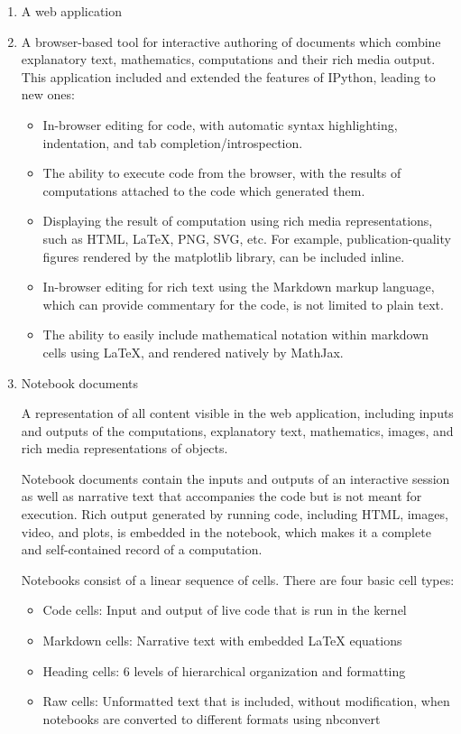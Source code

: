 \begin{enumerate}
\item A web application
\item A browser-based tool for interactive authoring of documents which combine
  explanatory text, mathematics, computations and their rich media output. This
  application included and extended the features of IPython, leading to new ones:
  \begin{itemize}
  \item In-browser editing for code, with automatic syntax highlighting, indentation, and
    tab completion/introspection.
  \item The ability to execute code from the browser, with the results of computations
    attached to the code which generated them.
  \item Displaying the result of computation using rich media representations, such as
    HTML, LaTeX, PNG, SVG, etc. For example, publication-quality figures rendered by the
    matplotlib library, can be included inline.
  \item In-browser editing for rich text using the Markdown markup language, which can
    provide commentary for the code, is not limited to plain text.
  \item The ability to easily include mathematical notation within markdown cells using
    LaTeX, and rendered natively by MathJax.
  \end{itemize}
	
\item Notebook documents

  A representation of all content visible in the web application, including inputs and
  outputs of the computations, explanatory text, mathematics, images, and rich media
  representations of objects.


  Notebook documents contain the inputs and outputs of an interactive session as well as
  narrative text that accompanies the code but is not meant for execution. Rich output
  generated by running code, including HTML, images, video, and plots, is embedded in the
  notebook, which makes it a complete and self-contained record of a computation.



  Notebooks consist of a linear sequence of cells. There are four basic cell types:
  \begin{itemize}
  \item Code cells: Input and output of live code that is run in the kernel
  \item Markdown cells: Narrative text with embedded LaTeX equations
  \item Heading cells: 6 levels of hierarchical organization and formatting
  \item Raw cells: Unformatted text that is included, without modification, when notebooks
    are converted to different formats using nbconvert
  \end{itemize}


\end{enumerate}
